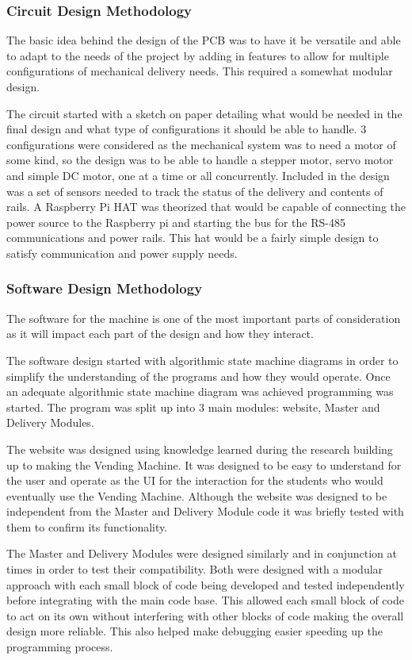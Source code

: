 \documentclass[a4paper,11pt]{article}
\numberwithin{figure}{section}
\numberwithin{table}{section}
\begin{document}
\subsubsection{Circuit Design Methodology}
The basic idea behind the design of the PCB was to have it be versatile and able to adapt to the needs of the project by adding in features to allow for multiple configurations of mechanical delivery needs. This required a somewhat modular design.

The circuit started with a sketch on paper detailing what would be needed in the final design and what type of configurations it should be able to handle. 3 configurations were considered as the mechanical system was to need a motor of some kind, so the design was to be able to handle a stepper motor, servo motor and simple DC motor, one at a time or all concurrently. Included in the design was a set of sensors needed to track the status of the delivery and contents of rails.
A Raspberry Pi HAT was theorized that would be capable of connecting the power source to the Raspberry pi and starting the bus for the RS-485 communications and power rails. This hat would be a fairly simple design to satisfy communication and power supply needs.



\subsubsection{Software Design Methodology}
The software for the machine is one of the most important parts of consideration as it will impact each part of the design and how they interact.

The software design started with algorithmic state machine diagrams in order to simplify the understanding of the programs and how they would operate. Once an adequate algorithmic state machine diagram was achieved programming was started. The program was split up into 3 main modules: website, Master and Delivery Modules. 

The website was designed using knowledge learned during the research building up to making the Vending Machine. It was designed to be easy to understand for the user and operate as the UI for the interaction for the students who would eventually use the Vending Machine. Although the website was designed to be independent from the Master and Delivery Module code it was briefly tested with them to confirm its functionality.

The Master and Delivery Modules were designed similarly and in conjunction at times in order to test their compatibility. Both were designed with a modular approach with each small block of code being developed and tested independently before integrating with the main code base. This allowed each small block of code to act on its own without interfering with other blocks of code making the overall design more reliable. This also helped make debugging easier speeding up the programming process.
\end{document}

